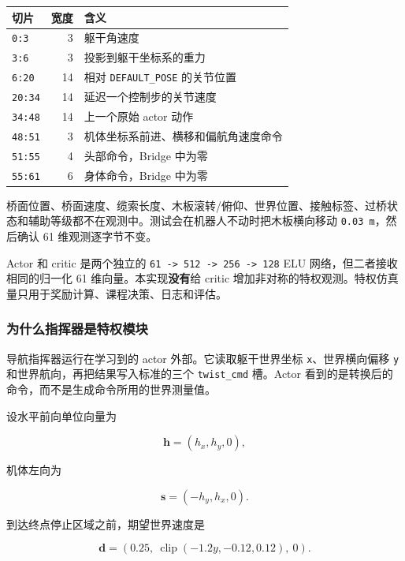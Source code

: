 \documentclass[
  chinese,
  11pt,
  letterpaper,
]{article}
\newcounter{none} %
\begin{document}
{\def\LTcaptype{none} %
\begin{longtable}[]{@{}lrl@{}}
\toprule\noalign{}
切片 & 宽度 & 含义 \\
\midrule\noalign{}
\endhead
\bottomrule\noalign{}
\endlastfoot
\texttt{0:3} & 3 & 躯干角速度 \\
\texttt{3:6} & 3 & 投影到躯干坐标系的重力 \\
\texttt{6:20} & 14 & 相对 \texttt{DEFAULT\_POSE} 的关节位置 \\
\texttt{20:34} & 14 & 延迟一个控制步的关节速度 \\
\texttt{34:48} & 14 & 上一个原始 actor 动作 \\
\texttt{48:51} & 3 & 机体坐标系前进、横移和偏航角速度命令 \\
\texttt{51:55} & 4 & 头部命令，Bridge 中为零 \\
\texttt{55:61} & 6 & 身体命令，Bridge 中为零 \\
\end{longtable}
}

桥面位置、桥面速度、缆索长度、木板滚转/俯仰、世界位置、接触标签、过桥状态和辅助等级都不在观测中。测试会在机器人不动时把木板横向移动
\texttt{0.03\ m}，然后确认 61 维观测逐字节不变。

Actor 和 critic 是两个独立的
\texttt{61\ -\textgreater{}\ 512\ -\textgreater{}\ 256\ -\textgreater{}\ 128}
ELU 网络，但二者接收相同的归一化 61 维向量。本实现\textbf{没有}给 critic
增加非对称的特权观测。特权仿真量只用于奖励计算、课程决策、日志和评估。

\subsubsection{为什么指挥器是特权模块}\label{ux4e3aux4ec0ux4e48ux6307ux6325ux5668ux662fux7279ux6743ux6a21ux5757}

导航指挥器运行在学习到的 actor 外部。它读取躯干世界坐标
\texttt{x}、世界横向偏移 \texttt{y} 和世界航向，再把结果写入标准的三个
\texttt{twist\_cmd} 槽。Actor
看到的是转换后的命令，而不是生成命令所用的世界测量值。

设水平前向单位向量为

\[
\mathbf h=(h_x,h_y,0),
\]

机体左向为

\[
\mathbf s=(-h_y,h_x,0).
\]

到达终点停止区域之前，期望世界速度是

\[
\mathbf d=
\left(
0.25,\
\operatorname{clip}(-1.2y,-0.12,0.12),\
0
\right).
\]
\end{document}
